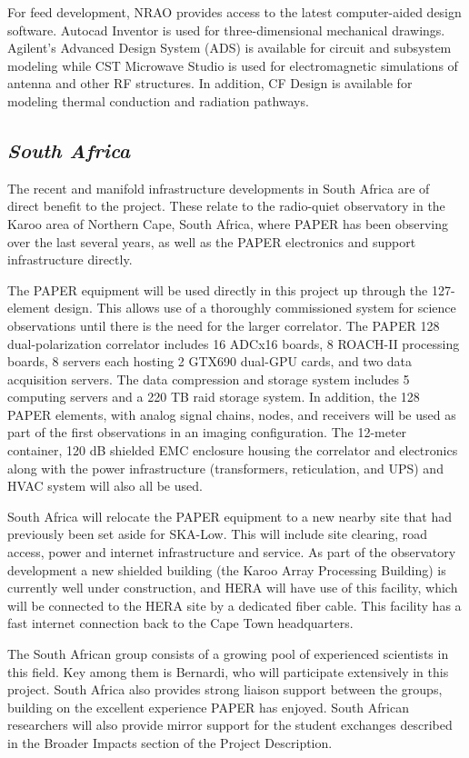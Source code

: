 \documentclass[11pt]{article}
\begin{document}
For feed development, NRAO provides access to the latest computer-aided design software. Autocad
Inventor is used for three-dimensional mechanical drawings. Agilent’s Advanced
Design System (ADS) is available for circuit and subsystem modeling while CST
Microwave Studio is used for electromagnetic simulations of antenna and other
RF structures. In addition, CF Design is available for modeling thermal
conduction and radiation pathways.

\subsection*{\it South Africa}

The recent and manifold infrastructure developments in South Africa are of
direct benefit to the project.  These relate to the radio-quiet observatory in
the Karoo area of Northern Cape, South Africa, where PAPER has been observing
over the last several years, as well as the PAPER electronics and support
infrastructure directly.

The PAPER equipment will be used directly in this project up through the
127-element design.  This allows use of a thoroughly commissioned system for
science observations until there is the need for the larger correlator.  The
PAPER 128 dual-polarization correlator includes 16 ADCx16 boards,  8 ROACH-II
processing boards, 8 servers each hosting 2 GTX690 dual-GPU cards, and two data
acquisition servers.  The data compression and storage system includes 5
computing servers and a 220 TB raid storage system.  In addition, the 128 PAPER
elements, with analog signal chains, nodes, and receivers will be used as
part of the first observations in an imaging configuration. The 12-meter
container, 120 dB shielded EMC enclosure housing the correlator and electronics
along with the power infrastructure (transformers, reticulation, and UPS) and
HVAC system will also all be used.

South Africa will relocate the PAPER equipment to a new nearby site that had previously
been set aside for SKA-Low.  This will include site clearing, road access,
power and internet infrastructure and service.  As part of the observatory
development a new shielded building (the Karoo Array
Processing Building) is currently well under
construction, and HERA will have use of this facility, which will be connected
to the HERA site by a dedicated fiber cable.  This facility has a fast internet
connection back to the Cape Town headquarters.

The South African group consists of a growing pool of experienced scientists in
this field.  Key among them is Bernardi, who will participate extensively in
this project.  South Africa also provides strong liaison support between the
groups, building on the excellent experience PAPER has enjoyed.  South African
researchers will also provide mirror support for the student exchanges described
in the Broader Impacts section of the Project Description.
\end{document}
